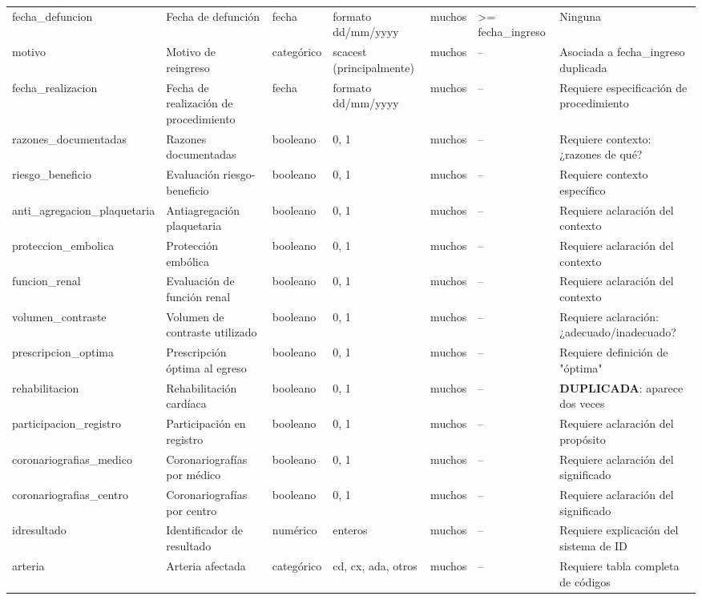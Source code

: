 \documentclass[11pt,a4paper]{article}
\begin{document}
\begin{longtable}{@{}L{0.095\textwidth} L{0.17\textwidth} L{0.07\textwidth} L{0.16\textwidth} L{0.14\textwidth} L{0.13\textwidth} L{0.15\textwidth}@{}}
fecha\_defuncion & Fecha de defunción & fecha & formato dd/mm/yyyy & muchos & >= fecha\_ingreso & Ninguna \\
motivo & Motivo de reingreso & categórico & scacest (principalmente) & muchos & -- & Asociada a fecha\_ingreso duplicada \\
fecha\_realizacion & Fecha de realización de procedimiento & fecha & formato dd/mm/yyyy & muchos & -- & Requiere especificación de procedimiento \\
razones\_documentadas & Razones documentadas & booleano & 0, 1 & muchos & -- & Requiere contexto: ¿razones de qué? \\
riesgo\_beneficio & Evaluación riesgo-beneficio & booleano & 0, 1 & muchos & -- & Requiere contexto específico \\
anti\_agregacion\_plaquetaria & Antiagregación plaquetaria & booleano & 0, 1 & muchos & -- & Requiere aclaración del contexto \\
proteccion\_embolica & Protección embólica & booleano & 0, 1 & muchos & -- & Requiere aclaración del contexto \\
funcion\_renal & Evaluación de función renal & booleano & 0, 1 & muchos & -- & Requiere aclaración del contexto \\
volumen\_contraste & Volumen de contraste utilizado & booleano & 0, 1 & muchos & -- & Requiere aclaración: ¿adecuado/inadecuado? \\
prescripcion\_optima & Prescripción óptima al egreso & booleano & 0, 1 & muchos & -- & Requiere definición de "óptima" \\
rehabilitacion & Rehabilitación cardíaca & booleano & 0, 1 & muchos & -- & \textbf{DUPLICADA}: aparece dos veces \\
participacion\_registro & Participación en registro & booleano & 0, 1 & muchos & -- & Requiere aclaración del propósito \\
coronariografias\_medico & Coronariografías por médico & booleano & 0, 1 & muchos & -- & Requiere aclaración del significado \\
coronariografias\_centro & Coronariografías por centro & booleano & 0, 1 & muchos & -- & Requiere aclaración del significado \\
idresultado & Identificador de resultado & numérico & enteros & muchos & -- & Requiere explicación del sistema de ID \\
arteria & Arteria afectada & categórico & cd, cx, ada, otros & muchos & -- & Requiere tabla completa de códigos \\

\end{longtable}
\end{document}
